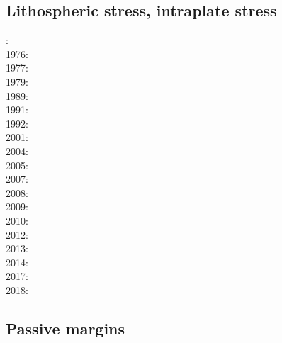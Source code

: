 \subsection{Lithospheric stress, intraplate stress}

{\scriptsize
{}: \cite{fouy75}\cite{sosr75}\\
1976: \cite{riss76}\\
1977: \cite{chtu77}\\
1979: \cite{riss79}\\
1989: \cite{boww89}\\
1991: \cite{worg91}\\
1992: \cite{rich92}\cite{wuvr92}\cite{zoba92}\cite{clko92}\\
2001: \cite{stsm01}\\
2004: \cite{ligu04}\\
2005: \cite{timr05}\\
2007: \cite{hert07}\\
2008: \cite{bilr08}\cite{ghhw08}\\
2009: \cite{ghhf09}\cite{nacl09}\\
2010: \cite{bepo10}\cite{yosh10}\\
2012: \cite{nalr12}\cite{ghho12}\cite{wagw12}\\
2013: \cite{ghhw13}\cite{wagw13}\\
2014: \cite{vagw14}\\
2017: \cite{grrb17}\\
2018: \cite{osss18}
}

\subsection{Passive margins} 

{\scriptsize
\noindent
\cite{clwv82}
\cite{lies86}
\cite{gebi05}
\cite{clbz08}
\cite{kasb08}
\cite{fasm10}
\cite{nigm10}
\cite{rapy11}
\cite{nigm11}
\cite{brfo11}
\cite{mana13}
\cite{yahb13}
\cite{macg14}
\cite{gebw15}
\cite{nigo15}
\cite{dupm16}
\cite{sahf18}
\cite{mube18}
\cite{tebu18}
\cite{zhli19}
}

